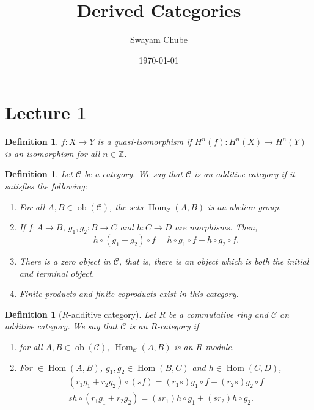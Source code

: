\documentclass{amsart}
\title{Derived Categories}
\author{Swayam Chube}
\date{\today}
\theoremstyle{thmstyle}
\theoremstyle{defstyle}
\newtheorem{definition}[theorem]{Definition}
\newcommand{\Z}{\mathbb{Z}}
\newcommand{\Hom}{\operatorname{Hom}}
\begin{document}
\maketitle

\section{Lecture 1}

\begin{definition}
    $f: X\to Y$ is a \emph{quasi-isomorphism} if $H^n(f): H^n(X)\to H^n(Y)$ is an isomorphism for all $n\in\Z$.
\end{definition}


\newcommand{\Mor}{\operatorname{Mor}}
\newcommand{\ob}{\operatorname{ob}}

\begin{definition}
    Let $\mathcal C$ be a category. We say that $\mathcal C$ is an \emph{additive category} if it satisfies the following: 
    \begin{enumerate}
        \item For all $A,B\in\ob(\mathcal C)$, the sets $\Hom_{\mathcal C}(A,B)$ is an abelian group.
        \item If $f: A\to B$, $g_1,g_2: B\to C$ and $h: C\to D$ are morphisms. Then, 
        \begin{equation*}
            h\circ(g_1 + g_2)\circ f = h\circ g_1\circ f + h\circ g_2\circ f.
        \end{equation*}
        \item There is a zero object in $\mathcal C$, that is, there is an object which is both the initial and terminal object.
        \item Finite products and finite coproducts exist in this category.
    \end{enumerate}
\end{definition}

\begin{definition}[$R$-additive category]
    Let $R$ be a commutative ring and $\mathcal C$ an additive category. We say that $\mathcal C$ is an $R$-category if 
    \begin{enumerate}
        \item for all $A,B\in\ob(\mathcal C)$, $\Hom_{\mathcal C}(A,B)$ is an $R$-module. 
        \item For $\in\Hom(A,B)$, $g_1,g_2\in\Hom(B,C)$ and $h\in\Hom(C,D)$, 
        \begin{align*}
            (r_1g_1 + r_2g_2)\circ(sf) = (r_1s)g_1\circ f + (r_2s)g_2\circ f\\
            sh\circ(r_1g_1 + r_2g_2) = (sr_1)h\circ g_1 + (sr_2)h\circ g_2.
        \end{align*}
    \end{enumerate}
\end{definition}
\end{document}
